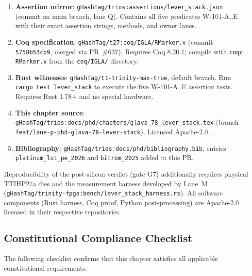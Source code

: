 \begin{enumerate}
  \item \textbf{Assertion mirror}: \texttt{gHashTag/trios:assertions/lever\_stack.json}
    (commit on main branch, lane Q).  Contains all five predicates W-101-A..E
    with their exact assertion strings, methods, and owner lanes.
  \item \textbf{Coq specification}: \texttt{gHashTag/t27:coq/IGLA/RMarker.v}
    (commit \texttt{5758b53cb9}, merged via PR~\#637).  Requires Coq 8.20.1;
    compile with \texttt{coqc RMarker.v} from the \texttt{coq/IGLA/} directory.
  \item \textbf{Rust witnesses}: \texttt{gHashTag/tt-trinity-max-true},
    default branch.  Run \texttt{cargo test lever\_stack} to execute the five
    W-101-A..E assertion tests.  Requires Rust 1.78+ and no special hardware.
  \item \textbf{This chapter source}: \texttt{gHashTag/trios:docs/phd/chapters/glava\_78\_lever\_stack.tex}
    (branch \texttt{feat/lane-p-phd-glava-78-lever-stack}).  Licensed Apache-2.0.
  \item \textbf{Bibliography}: \texttt{gHashTag/trios:docs/phd/bibliography.bib},
    entries \texttt{platinum\_lut\_pe\_2026} and \texttt{bitrom\_2025} added in
    this PR.
\end{enumerate}

Reproducibility of the post-silicon verdict (gate G7) additionally requires
physical TTIHP27a dies and the measurement harness developed by Lane~M
(\texttt{gHashTag/trinity-fpga:bench/lever\_stack\_harness.rs}).
All software components (Rust harness, Coq proof, Python post-processing)
are Apache-2.0 licensed in their respective repositories.

\subsection{Constitutional Compliance Checklist}

The following checklist confirms that this chapter satisfies all applicable
constitutional requirements:

